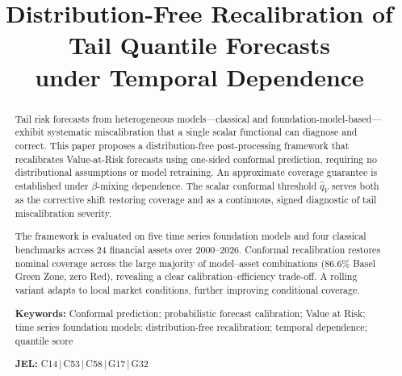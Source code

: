 \documentclass[preprint,11pt,authoryear]{elsarticle}
\newcommand{\1}{\boldsymbol{1}}
\begin{document}
	
	\begin{frontmatter}
		
		\title{Distribution-Free Recalibration of Tail Quantile Forecasts\\
			under Temporal Dependence}
		
		
		\begin{abstract}
			Tail risk forecasts from heterogeneous models---classical and
			foundation-model-based---exhibit systematic miscalibration that a
			single scalar functional can diagnose and correct. This paper
			proposes a distribution-free post-processing framework that
			recalibrates Value-at-Risk forecasts using one-sided conformal
			prediction, requiring no distributional assumptions or model
			retraining. An approximate coverage guarantee is established under
			$\beta$-mixing dependence. The scalar conformal threshold
			$\hat{q}_V$ serves both as the corrective shift restoring coverage
			and as a continuous, signed diagnostic of tail miscalibration
			severity.
			
			The framework is evaluated on five time series foundation models
			and four classical benchmarks across 24 financial assets over
			2000--2026. Conformal recalibration restores nominal coverage
			across the large majority of model--asset combinations (86.6\%
			Basel Green Zone, zero Red), revealing a clear
			calibration--efficiency trade-off. A rolling variant adapts to
			local market conditions, further improving conditional coverage.
			
			\bigskip\noindent
			\textbf{Keywords:} Conformal prediction; probabilistic forecast calibration; Value at Risk; time series foundation models; distribution-free recalibration; temporal dependence; quantile score
			
			\bigskip\noindent
			\textbf{JEL:} C14\,|\,C53\,|\,C58\,|\,G17\,|\,G32
		\end{abstract}
		
	\end{frontmatter}
	
\end{document}
